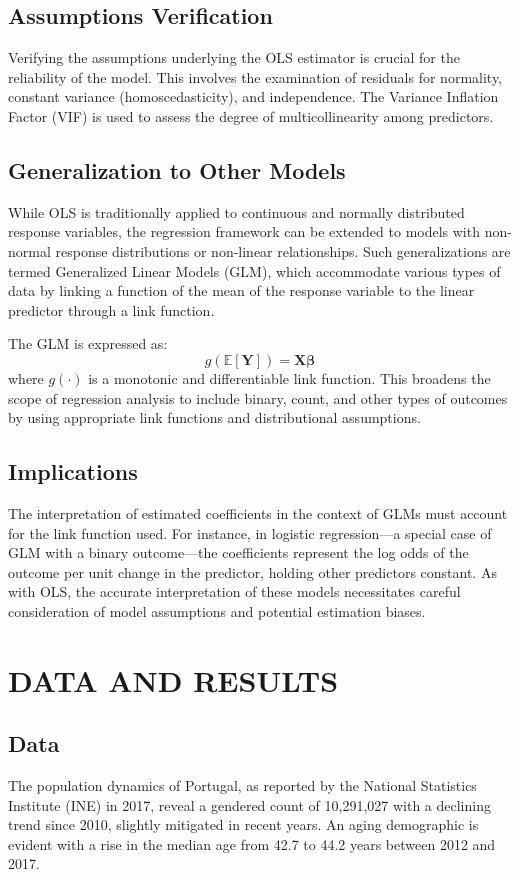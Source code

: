 \documentclass{aip-cp}
\begin{document}
\subsection{Assumptions Verification}
Verifying the assumptions underlying the OLS estimator is crucial for the reliability of the model. This involves the examination of residuals for normality, constant variance (homoscedasticity), and independence. The Variance Inflation Factor (VIF) is used to assess the degree of multicollinearity among predictors.

\subsection{Generalization to Other Models}
While OLS is traditionally applied to continuous and normally distributed response variables, the regression framework can be extended to models with non-normal response distributions or non-linear relationships. Such generalizations are termed Generalized Linear Models (GLM), which accommodate various types of data by linking a function of the mean of the response variable to the linear predictor through a link function.

The GLM is expressed as:
\begin{equation}
    g(\mathbb{E}[\mathbf{Y}]) = \mathbf{X}\bm{\beta}
\end{equation}
where \(g(\cdot)\) is a monotonic and differentiable link function. This broadens the scope of regression analysis to include binary, count, and other types of outcomes by using appropriate link functions and distributional assumptions.

\subsection{Implications}
The interpretation of estimated coefficients in the context of GLMs must account for the link function used. For instance, in logistic regression—a special case of GLM with a binary outcome—the coefficients represent the log odds of the outcome per unit change in the predictor, holding other predictors constant. As with OLS, the accurate interpretation of these models necessitates careful consideration of model assumptions and potential estimation biases.


\section{\uppercase{Data and Results}}
\subsection{Data}
The population dynamics of Portugal, as reported by the National Statistics Institute (INE) in 2017, reveal a gendered count of 10,291,027 with a declining trend since 2010, slightly mitigated in recent years. An aging demographic is evident with a rise in the median age from 42.7 to 44.2 years between 2012 and 2017. 
\end{document}
